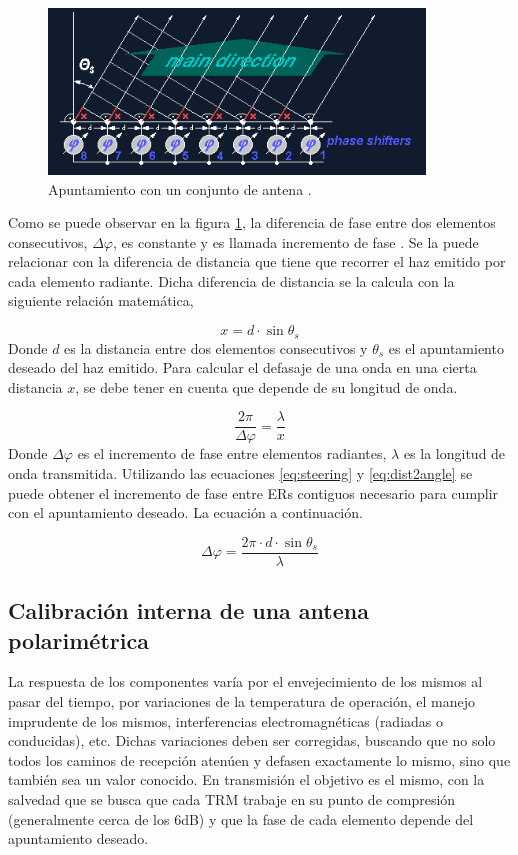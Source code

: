\begin{figure}[H]
 \centering
 \includegraphics[width=10cm]{gfx/beamSteering.png}
 \caption{Apuntamiento con un conjunto de antena \cite{BeamSteering}.}
 \label{fig:beamSteering}
\end{figure}

Como se puede observar en la figura \ref{fig:beamSteering}, la diferencia de fase entre dos elementos consecutivos,
$\Delta\varphi$, es constante y es llamada incremento de fase \cite{BeamSteering}. Se la puede relacionar con la diferencia
de distancia que tiene que recorrer el haz emitido por cada elemento radiante. Dicha diferencia de distancia se la calcula con
la siguiente relación matemática,


\begin{equation}
	x = d\cdot \sin{\theta_s}
	\label{eq:steering}
\end{equation}
Donde $d$ es la distancia entre dos elementos consecutivos y $\theta_s$ es el apuntamiento deseado del haz emitido. Para calcular
el defasaje de una onda en una cierta distancia $x$, se debe tener en cuenta que depende de su longitud de onda.

\begin{equation}
	\dfrac{2\pi}{\Delta\varphi} = \dfrac{\lambda}{x}
	\label{eq:dist2angle}
\end{equation}
Donde $\Delta\varphi$ es el incremento de fase entre elementos radiantes, $\lambda$ es la longitud de onda transmitida.
Utilizando las ecuaciones \ref{eq:steering} y \ref{eq:dist2angle} se puede obtener el incremento de fase entre ERs contiguos 
necesario para cumplir con el apuntamiento deseado. La ecuación a continuación.

\begin{equation}
	\Delta\varphi = \dfrac{2\pi\cdot d\cdot\sin{\theta_s}}{\lambda}
\end{equation}

\subsection{Calibración interna de una antena polarimétrica}
La respuesta de los componentes varía por el envejecimiento de los mismos al pasar del tiempo, por variaciones de la temperatura
de operación, el manejo imprudente de los mismos, interferencias electromagnéticas (radiadas o conducidas), etc. Dichas 
variaciones deben ser corregidas, buscando que no solo todos los caminos de recepción atenúen y defasen exactamente lo
mismo, sino que también sea un valor conocido. En transmisión el objetivo es el mismo, con la salvedad que se busca que cada
TRM trabaje en su punto de compresión (generalmente cerca de los 6dB) y que la fase de cada elemento depende del apuntamiento
deseado.

